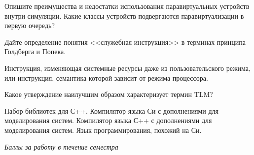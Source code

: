 \documentclass[a4paper, addpoints]{exam}
\begin{document}
\begin{questions}
\question[2] Опишите преимущества и недостатки использования паравиртуальных устройств внутри симуляции. Какие классы устройств подвергаются паравиртуализации в первую очередь?
\begin{solution}[2cm]
\end{solution}

\question[2] Дайте определение понятия <<служебная инструкция>> в терминах принципа Голдберга и Попека.
\begin{solution}[2cm]
Инструкция, изменяющая системные ресурсы даже из пользовательского режима, или инструкция, семантика которой зависит от режима процессора.
\end{solution}

\question[1] Какое утверждение наилучшим образом характеризует термин TLM?
\begin{choices}
    \correctchoice Набор библиотек для С++.
    \choice Компилятор языка Си с дополнениями для моделирования систем.
    \choice Компилятор языка С++ с дополнениями для моделирования систем.
    \choice Язык программирования, похожий на Си.
\end{choices}

\bonusquestion \textit{Баллы за работу в течение семестра}

\newpage
\phantom{Blank page}

\end{questions}
\end{document}
